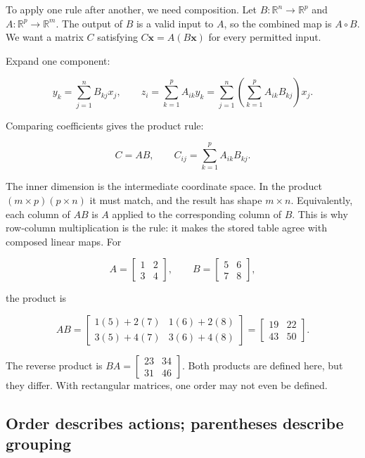 To apply one rule after another, we need composition. Let \(B:\mathbb R^n\to\mathbb R^p\) and \(A:\mathbb R^p\to\mathbb R^m\). The output of \(B\) is a valid input to \(A\), so the combined map is \(A\circ B\). We want a matrix \(C\) satisfying \(C\mathbf x=A(B\mathbf x)\) for every permitted input.

Expand one component:

\[
y_k=\sum_{j=1}^{n}B_{kj}x_j,
\qquad
z_i=\sum_{k=1}^{p}A_{ik}y_k
=\sum_{j=1}^{n}\left(\sum_{k=1}^{p}A_{ik}B_{kj}\right)x_j.
\]

Comparing coefficients gives the product rule:

\[
C=AB,\qquad C_{ij}=\sum_{k=1}^{p}A_{ik}B_{kj}.
\]

The inner dimension is the intermediate coordinate space. In the product \((m\times p)(p\times n)\) it must match, and the result has shape \(m\times n\). Equivalently, each column of \(AB\) is \(A\) applied to the corresponding column of \(B\). This is why row-column multiplication is the rule: it makes the stored table agree with composed linear maps. For

\[
A=\begin{bmatrix}1&2\\3&4\end{bmatrix},\qquad
B=\begin{bmatrix}5&6\\7&8\end{bmatrix},
\]

the product is

\[
AB=\begin{bmatrix}1(5)+2(7)&1(6)+2(8)\\3(5)+4(7)&3(6)+4(8)\end{bmatrix}
=\begin{bmatrix}19&22\\43&50\end{bmatrix}.
\]

The reverse product is \(BA=\begin{bmatrix}23&34\\31&46\end{bmatrix}\). Both products are defined here, but they differ. With rectangular matrices, one order may not even be defined.

\subsection{Order describes actions; parentheses describe grouping}\label{01-foundations-i-ch018-order-describes-actions-parentheses-describe-grouping}

